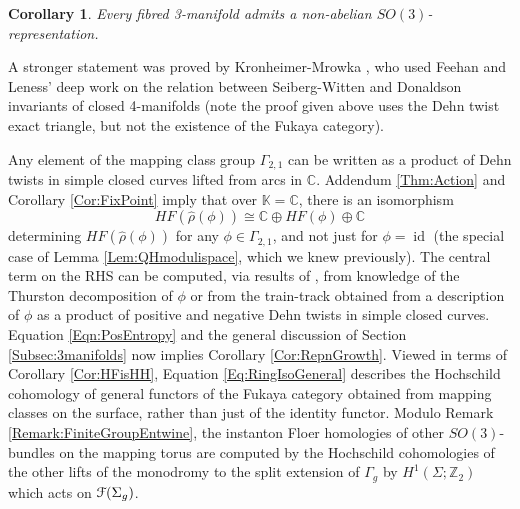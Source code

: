\documentclass[reqno,10pt]{amsart}
\numberwithin{equation}{section}
\newcommand{\bC}{{\mathbb C}}
\newcommand{\bK}{{\mathbb K}}
\newcommand{\bZ}{{\mathbb Z}}
\newcommand{\scrF}{\EuScript{F}}
\newcommand{\id}{\operatorname{id}}
\newtheorem{Corollary}[thm]{Corollary}
\theoremstyle{remark}
\begin{document}
\begin{Corollary}
Every fibred 3-manifold admits a non-abelian $SO(3)$-representation.
\end{Corollary}

A stronger statement was proved by Kronheimer-Mrowka \cite{KM2}, who used Feehan and Leness' deep work on the relation between Seiberg-Witten and Donaldson invariants of closed 4-manifolds (note the proof given above uses the Dehn twist exact triangle, but not the existence of the Fukaya category).


Any element of the mapping class group $\Gamma_{2,1}$ can be written as a product of Dehn twists in simple closed curves lifted from arcs in $\bC$.  Addendum \ref{Thm:Action} and Corollary \ref{Cor:FixPoint} imply that over $\bK = \bC$, there is an isomorphism 
\begin{equation} \label{Eq:RingIsoGeneral}
HF(\hat\rho(\phi)) \cong \bC \oplus HF(\phi) \oplus \bC
\end{equation}
determining $HF(\hat\rho(\phi))$ for any $\phi \in \Gamma_{2,1}$, and not just for $\phi=\id$ (the special case of Lemma \ref{Lem:QHmodulispace}, which we knew previously).  The central term on the RHS can be computed, via results of \cite{Cotton-Clay}, from knowledge of the Thurston decomposition of $\phi$ or from the train-track obtained from a description of $\phi$ as a product of positive and negative Dehn twists in simple closed curves.  Equation \ref{Eqn:PosEntropy} and the general discussion of Section \ref{Subsec:3manifolds} now implies Corollary \ref{Cor:RepnGrowth}.  Viewed in terms of Corollary \ref{Cor:HFisHH},  Equation \ref{Eq:RingIsoGeneral} describes the Hochschild cohomology of general functors of the Fukaya category obtained from mapping classes on the surface, rather than just of the identity functor.  Modulo Remark \ref{Remark:FiniteGroupEntwine}, the instanton Floer homologies of other $SO(3)$-bundles on the mapping torus are computed by the Hochschild cohomologies of the other lifts of the monodromy to the split extension of $\Gamma_g$ by $H^1(\Sigma;\bZ_2)$ which acts on $\scrF(\Sigma_g)$.
\end{document}
